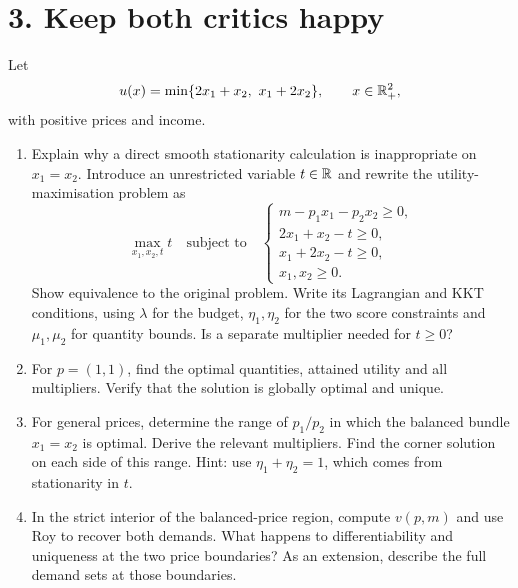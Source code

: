 \section*{3. Keep both critics happy}
Let
\[
 u(x)=\min\{2x_1+x_2,\ x_1+2x_2\},\qquad x\in\R_+^2,
\]
with positive prices and income.
\begin{enumerate}[label=(\alph*)]
\item Explain why a direct smooth stationarity calculation is inappropriate on $x_1=x_2$. Introduce an unrestricted variable $t\in\mathbb R$ and rewrite the utility-maximisation problem as
\[
 \max_{x_1,x_2,t}t\quad\text{subject to}\quad
 \begin{cases}
 m-p_1x_1-p_2x_2\ge0,\\
 2x_1+x_2-t\ge0,\\
 x_1+2x_2-t\ge0,\\
 x_1,x_2\ge0.
 \end{cases}
\]
Show equivalence to the original problem. Write its Lagrangian and KKT conditions, using $\lambda$ for the budget, $\eta_1,\eta_2$ for the two score constraints and $\mu_1,\mu_2$ for quantity bounds. Is a separate multiplier needed for $t\ge0$?
\item For $p=(1,1)$, find the optimal quantities, attained utility and all multipliers. Verify that the solution is globally optimal and unique.
\item For general prices, determine the range of $p_1/p_2$ in which the balanced bundle $x_1=x_2$ is optimal. Derive the relevant multipliers. Find the corner solution on each side of this range. Hint: use $\eta_1+\eta_2=1$, which comes from stationarity in $t$.
\item In the strict interior of the balanced-price region, compute $v(p,m)$ and use Roy to recover both demands. What happens to differentiability and uniqueness at the two price boundaries? As an extension, describe the full demand sets at those boundaries.
\end{enumerate}
